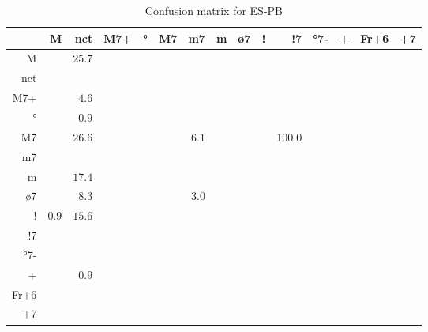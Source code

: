 \documentclass{article}
\begin{document}
\begin{table}
\begin{center}
\begin{tabular}{r|r|r|r|r|r|r|r|r|r|r|r|r|r|r}
       & M & nct & M7+ & ° & M7 & m7 & m & ø7 & ! & !7 & °7- & + & Fr+6 & +7 \\ \hline
 M & $ $ & $25.7$ & $ $ & $ $ & $ $ & $ $ & $ $ & $ $ & $ $ & $ $ & $ $ & $ $ & $ $ & $ $  \\ \hline
 nct & $ $ & $ $ & $ $ & $ $ & $ $ & $ $ & $ $ & $ $ & $ $ & $ $ & $ $ & $ $ & $ $ & $ $  \\ \hline
 M7+ & $ $ & $4.6$ & $ $ & $ $ & $ $ & $ $ & $ $ & $ $ & $ $ & $ $ & $ $ & $ $ & $ $ & $ $  \\ \hline
 ° & $ $ & $0.9$ & $ $ & $ $ & $ $ & $ $ & $ $ & $ $ & $ $ & $ $ & $ $ & $ $ & $ $ & $ $  \\ \hline
 M7 & $ $ & $26.6$ & $ $ & $ $ & $ $ & $6.1$ & $ $ & $ $ & $ $ & $100.0$ & $ $ & $ $ & $ $ & $ $  \\ \hline
 m7 & $ $ & $ $ & $ $ & $ $ & $ $ & $ $ & $ $ & $ $ & $ $ & $ $ & $ $ & $ $ & $ $ & $ $  \\ \hline
 m & $ $ & $17.4$ & $ $ & $ $ & $ $ & $ $ & $ $ & $ $ & $ $ & $ $ & $ $ & $ $ & $ $ & $ $  \\ \hline
 ø7 & $ $ & $8.3$ & $ $ & $ $ & $ $ & $3.0$ & $ $ & $ $ & $ $ & $ $ & $ $ & $ $ & $ $ & $ $  \\ \hline
 ! & $0.9$ & $15.6$ & $ $ & $ $ & $ $ & $ $ & $ $ & $ $ & $ $ & $ $ & $ $ & $ $ & $ $ & $ $  \\ \hline
 !7 & $ $ & $ $ & $ $ & $ $ & $ $ & $ $ & $ $ & $ $ & $ $ & $ $ & $ $ & $ $ & $ $ & $ $  \\ \hline
 °7- & $ $ & $ $ & $ $ & $ $ & $ $ & $ $ & $ $ & $ $ & $ $ & $ $ & $ $ & $ $ & $ $ & $ $  \\ \hline
 + & $ $ & $0.9$ & $ $ & $ $ & $ $ & $ $ & $ $ & $ $ & $ $ & $ $ & $ $ & $ $ & $ $ & $ $  \\ \hline
 Fr+6 & $ $ & $ $ & $ $ & $ $ & $ $ & $ $ & $ $ & $ $ & $ $ & $ $ & $ $ & $ $ & $ $ & $ $  \\ \hline
 +7 & $ $ & $ $ & $ $ & $ $ & $ $ & $ $ & $ $ & $ $ & $ $ & $ $ & $ $ & $ $ & $ $ & $ $  \\ \hline
\end{tabular}
\caption{Confusion matrix for ES-PB}
\end{center}
\end{table}
\end{document}

